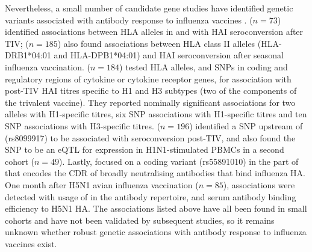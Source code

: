 Nevertheless, a small number of candidate gene studies have identified genetic variants associated with antibody response to influenza vaccines \autocite{linnik2016ImpactHostGenetic}.
\textcite{gelder2002AssociationsHumanLeukocyte} ($n=73$) identified associations between \gls{HLA} alleles in  and  with \gls{HAI} seroconversion after \gls{TIV};
\textcite{moss2013CorrelationHumanLeukocyte} ($n=185$) also found associations between \gls{HLA} class II alleles (HLA-DRB1*04:01 and HLA-DPB1*04:01) and \gls{HAI} seroconversion after seasonal influenza vaccination.
\textcite{poland2008ImmunogeneticsSeasonalInfluenza} ($n=184$) tested HLA alleles, and \glspl{SNP} in coding and regulatory regions of cytokine or cytokine receptor genes, for association with post-\gls{TIV} \gls{HAI} titres specific to H1 and H3 subtypes (two of the components of the trivalent vaccine).
They reported nominally significant associations for two  alleles with H1-specific titres,
six \gls{SNP} associations with H1-specific titres
and ten \gls{SNP} associations with H3-specific titres.
\textcite{egli2014IL28BKeyRegulator} ($n=196$) identified a \gls{SNP} upstream of  (rs8099917) to be associated with seroconversion post-\gls{TIV},
and also found the \gls{SNP} to be an \gls{eQTL} for  expression in H1N1-stimulated \glspl{PBMC} in a second cohort ($n=49$).
Lastly, \textcite{avnir2016IGHV169PolymorphismModulates} focused on a coding variant (rs55891010) in the part of  that encodes the \gls{CDR} of broadly neutralising antibodies that bind influenza \gls{HA}.
One month after H5N1 avian influenza vaccination ($n=85$), associations were detected with usage of  in the antibody repertoire,
and serum antibody binding efficiency to H5N1 \gls{HA}.
The associations listed above have all been found in small cohorts and have not been validated by subsequent studies,
so it remains unknown whether robust genetic associations with antibody response to influenza vaccines exist.

%

